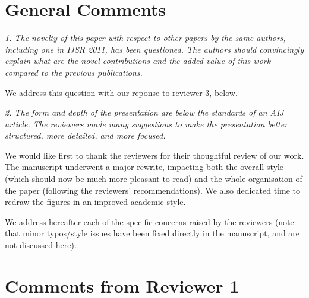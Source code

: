 \documentclass{article}
\begin{document}
\section{General Comments}

\emph{1. The novelty of this paper with respect to other papers by the same
authors, including one in IJSR 2011, has been questioned. The authors should
convincingly explain what are the novel contributions and the added value of
this work compared to the previous publications.}

We address this question with our reponse to reviewer 3, below.

\emph{2. The form and depth of the presentation are below the standards of an
AIJ article.  The reviewers made many suggestions to make the presentation
better structured, more detailed, and more focused.}

We would like first to thank the reviewers for their thoughtful review of our
work. The manuscript underwent a major rewrite, impacting both the overall style
(which should now be much more pleasant to read) and the whole organisation of
the paper (following the reviewers' recommendations). We also dedicated time to
redraw the figures in an improved academic style.

We address hereafter each of the specific concerns raised by the reviewers (note
that minor typos/style issues have been fixed directly in the manuscript, and
are not discussed here).


\section{Comments from Reviewer 1}
\end{document}
